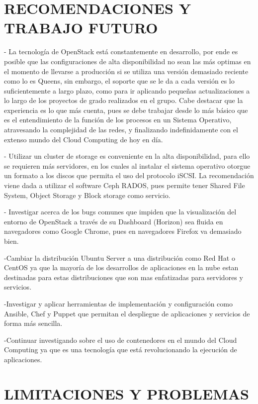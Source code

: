     \newpage\chapter{RECOMENDACIONES Y TRABAJO FUTURO}
    
    - La tecnología de OpenStack está constantemente en desarrollo, por ende es posible que las configuraciones de alta disponibilidad no sean las más optimas en el momento de llevarse a producción si se utiliza una versión demasiado reciente como lo es Queens, sin embargo, el soporte que se le da a cada versión es lo suficientemente a largo plazo, como para ir aplicando pequeñas actualizaciones a lo largo de los proyectos de grado realizados en el grupo. Cabe destacar que la experiencia es lo que más cuenta, pues se debe trabajar desde lo más básico que es el entendimiento de la función de los procesos en un Sistema Operativo, atravesando la complejidad de las redes, y finalizando indefinidamente con el extenso mundo del Cloud Computing de hoy en día.
    
    - Utilizar un cluster de storage es conveniente en la alta disponibilidad, para ello se requieren más servidores, en los cuales al instalar el sistema operativo otorgue un formato a los discos que permita el uso del protocolo iSCSI. La recomendación viene dada a utilizar el software Ceph RADOS, pues permite tener Shared File System, Object Storage y Block storage como servicio.
    
    - Investigar acerca de los bugs comunes que impiden que la visualización del entorno de OpenStack a través de su Dashboard (Horizon) sea fluida en navegadores como Google Chrome, pues en navegadores Firefox va demasiado bien.
    
    -Cambiar la distribución Ubuntu Server a una distribución como Red Hat o CentOS ya que la mayoría de los desarrollos de aplicaciones en la nube estan destinadas para estas distribuciones que son mas enfatizadas para servidores y servicios.
    
    -Investigar y aplicar herramientas de implementación y configuración como Ansible, Chef y Puppet que permitan el despliegue de aplicaciones y servicios de forma más sencilla.
    
    
    -Continuar investigando sobre el uso de contenedores en el mundo del Cloud Computing ya que es una tecnología que está revolucionando la ejecución de aplicaciones.
    
    
    
    \newpage\chapter{LIMITACIONES Y PROBLEMAS} 
    
